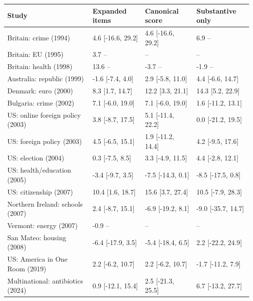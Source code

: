 \begin{tabular}{llll}
\toprule
Study & Expanded items & Canonical score & Substantive only \\
\midrule
Britain: crime (1994) & 4.6 [-16.6, 29.2] & 4.6 [-16.6, 29.2] & 6.9 -- \\
Britain: EU (1995) & 3.7 -- & -- & -- \\
Britain: health (1998) & 13.6 -- & -3.7 -- & -1.9 -- \\
Australia: republic (1999) & -1.6 [-7.4, 4.0] & 2.9 [-5.8, 11.0] & 4.4 [-6.6, 14.7] \\
Denmark: euro (2000) & 8.3 [1.7, 14.7] & 12.2 [3.3, 21.1] & 14.3 [5.2, 22.9] \\
Bulgaria: crime (2002) & 7.1 [-6.0, 19.0] & 7.1 [-6.0, 19.0] & 1.6 [-11.2, 13.1] \\
US: online foreign policy (2003) & 3.8 [-8.7, 17.5] & 5.1 [-11.4, 22.2] & 0.0 [-21.2, 19.5] \\
US: foreign policy (2003) & 4.5 [-6.5, 15.1] & 1.9 [-11.2, 14.4] & 4.2 [-9.5, 17.6] \\
US: election (2004) & 0.3 [-7.5, 8.5] & 3.3 [-4.9, 11.5] & 4.4 [-2.8, 12.1] \\
US: health/education (2005) & -3.4 [-9.7, 3.5] & -7.5 [-14.3, 0.1] & -8.5 [-17.5, 0.8] \\
US: citizenship (2007) & 10.4 [1.6, 18.7] & 15.6 [3.7, 27.4] & 10.5 [-7.9, 28.3] \\
Northern Ireland: schools (2007) & 2.4 [-8.7, 15.1] & -6.9 [-19.2, 8.1] & -9.0 [-35.7, 14.7] \\
Vermont: energy (2007) & -0.9 -- & -- & -- \\
San Mateo: housing (2008) & -6.4 [-17.9, 3.5] & -5.4 [-18.4, 6.5] & 2.2 [-22.2, 24.9] \\
US: America in One Room (2019) & 2.2 [-6.2, 10.7] & 2.2 [-6.2, 10.7] & -1.7 [-11.2, 7.9] \\
Multinational: antibiotics (2024) & 0.9 [-12.1, 15.4] & 2.5 [-21.3, 25.5] & 6.7 [-13.2, 27.7] \\
\bottomrule
\end{tabular}
